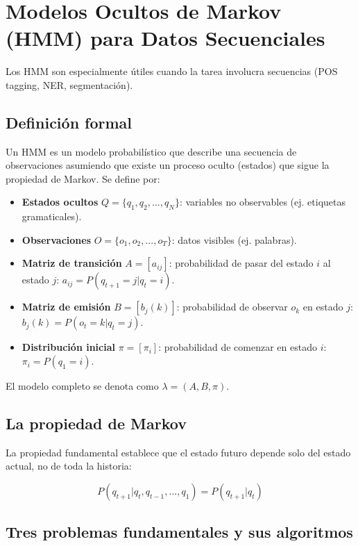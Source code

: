 \documentclass[12pt,a4paper,openany,oneside]{book}
\begin{document}
\section{Modelos Ocultos de Markov (HMM) para Datos Secuenciales}

Los HMM son especialmente útiles cuando la tarea involucra secuencias (POS tagging, NER, segmentación).

\subsection{Definición formal}
Un HMM es un modelo probabilístico que describe una secuencia de observaciones asumiendo que existe un proceso oculto (estados) que sigue la propiedad de Markov. Se define por:

\begin{itemize}
    \item \textbf{Estados ocultos} \(Q = \{q_1, q_2, ..., q_N\}\): variables no observables (ej. etiquetas gramaticales).
    \item \textbf{Observaciones} \(O = \{o_1, o_2, ..., o_T\}\): datos visibles (ej. palabras).
    \item \textbf{Matriz de transición} \(A = [a_{ij}]\): probabilidad de pasar del estado \(i\) al estado \(j\): \(a_{ij} = P(q_{t+1} = j | q_t = i)\).
    \item \textbf{Matriz de emisión} \(B = [b_j(k)]\): probabilidad de observar \(o_k\) en estado \(j\): \(b_j(k) = P(o_t = k | q_t = j)\).
    \item \textbf{Distribución inicial} \(\pi = [\pi_i]\): probabilidad de comenzar en estado \(i\): \(\pi_i = P(q_1 = i)\).
\end{itemize}

El modelo completo se denota como \(\lambda = (A, B, \pi)\).

\subsection{La propiedad de Markov}
La propiedad fundamental establece que el estado futuro depende solo del estado actual, no de toda la historia:

\[
P(q_{t+1} | q_t, q_{t-1}, ..., q_1) = P(q_{t+1} | q_t)
\]

\subsection{Tres problemas fundamentales y sus algoritmos}
\end{document}
